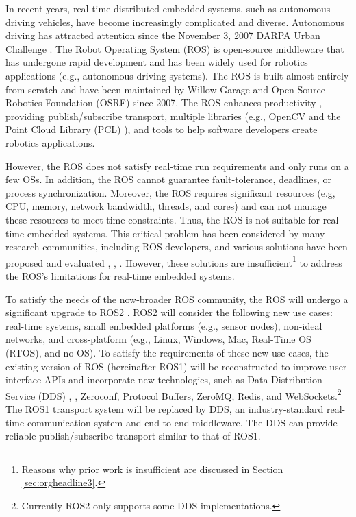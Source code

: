 \documentclass{sig-alternate-05-2015}
\begin{document}
In recent years, real-time distributed embedded systems, such as autonomous driving vehicles, have become increasingly complicated and diverse.
Autonomous driving has attracted attention since the November 3, 2007 DARPA Urban Challenge \cite{urmson2008autonomous}.
The Robot Operating System (ROS) \cite{quigley2009ros} is open-source middleware that has undergone rapid development \cite{cousins2011exponential} and has been widely used for robotics applications (e.g., autonomous driving systems).
The ROS is built almost entirely from scratch and have been maintained by Willow Garage \cite{willowgarage} and Open Source Robotics Foundation (OSRF) \cite{osrf} since 2007. 
The ROS enhances productivity \cite{cousins2010sharing}, providing publish/subscribe transport, multiple libraries (e.g., OpenCV and the Point Cloud Library (PCL) \cite{pcl}), and tools to help software developers create robotics applications.

However, the ROS does not satisfy real-time run requirements and only runs on a few OSs. 
In addition, the ROS cannot guarantee fault-tolerance, deadlines, or process synchronization.
Moreover, the ROS requires significant resources (e.g, CPU, memory, network bandwidth, threads, and cores) and can not manage these resources to meet time constraints.
Thus, the ROS is not suitable for real-time embedded systems. 
This critical problem has been considered by many research communities, including ROS developers, and various solutions have been proposed and evaluated \cite{rosc@roscon2013}, \cite{uros@roscon2013}, \cite{wei2015rt}.
However, these solutions are insufficient\footnote{Reasons why prior work is insufficient are discussed in Section \ref{sec:orgheadline3}.}  to address the ROS's limitations for real-time embedded systems. 

To satisfy the needs of the now-broader ROS community, the ROS will undergo a significant upgrade to ROS2 \cite{ros2_iccps2016}. 
ROS2 will consider the following new use cases: real-time systems, small embedded platforms (e.g., sensor nodes), non-ideal networks, and cross-platform (e.g., Linux, Windows, Mac, Real-Time OS (RTOS), and no OS).
To satisfy the requirements of these new use cases, the existing version of ROS (hereinafter ROS1) will be reconstructed to improve user-interface APIs and incorporate new technologies, such as Data Distribution Service (DDS) \cite{pardo2003omg}, \cite{schlesselman2004omg}, Zeroconf, Protocol Buffers, ZeroMQ, Redis, and WebSockets.\footnote{Currently ROS2 only supports some DDS implementations.}
The ROS1 transport system will be replaced by DDS, an industry-standard real-time communication system and end-to-end middleware. 
The DDS can provide reliable publish/subscribe transport similar to that of ROS1.
\end{document}
